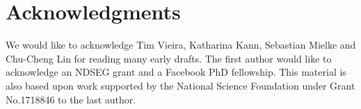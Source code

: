 \documentclass[11pt,a4paper]{article}
\begin{document}
\section*{Acknowledgments}
We would like to acknowledge Tim Vieira, Katharina Kann, Sebastian
Mielke and Chu-Cheng Lin for reading many early drafts. The first
author would like to acknowledge an NDSEG grant and a Facebook PhD
fellowship.  This material is also based upon work supported by the National
Science Foundation under Grant No.\@ 1718846 to the last author.



\end{document}
